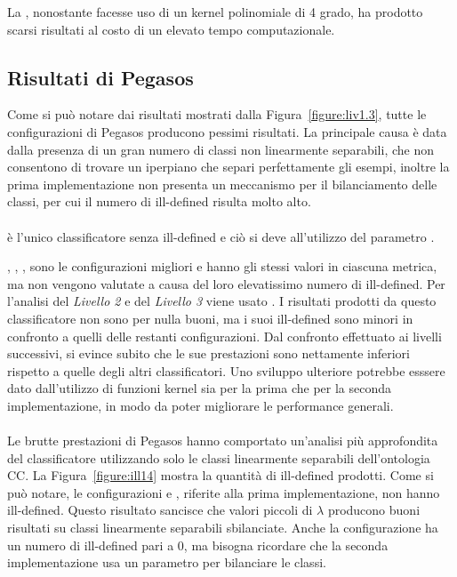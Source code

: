 \documentclass[12pt,a4paper,oneside,hidelinks]{report}
\begin{document}
La , nonostante facesse uso di un kernel polinomiale di 4 grado, ha prodotto scarsi risultati al costo di un elevato tempo computazionale.

\subsection{Risultati di Pegasos}
Come si può notare dai risultati mostrati dalla Figura~\ref{figure:liv1.3}, tutte le configurazioni di Pegasos producono pessimi risultati. La principale causa è data dalla presenza di un gran numero di classi non linearmente separabili, che non consentono di trovare un iperpiano che separi perfettamente gli esempi, inoltre la prima implementazione non presenta un meccanismo per il bilanciamento delle classi, per cui il numero di ill-defined risulta molto alto.

\paragraph*{}
 è l'unico classificatore senza ill-defined e ciò si deve all'utilizzo del parametro .

, , ,  sono le configurazioni migliori e hanno gli stessi valori in ciascuna metrica, ma non vengono valutate a causa del loro elevatissimo numero di ill-defined. Per l'analisi del \textit{Livello 2} e del \textit{Livello 3} viene usato . I risultati prodotti da questo classificatore non sono per nulla buoni, ma i suoi ill-defined sono minori in confronto a quelli delle restanti configurazioni. Dal confronto effettuato ai livelli successivi, si evince subito che le sue prestazioni sono nettamente inferiori rispetto a quelle degli altri classificatori.
Uno sviluppo ulteriore potrebbe esssere dato dall'utilizzo di funzioni kernel sia per la prima che per la seconda implementazione, in modo da poter migliorare le performance generali.

\paragraph*{}
Le brutte prestazioni di Pegasos hanno comportato un'analisi più approfondita del classificatore utilizzando solo le classi linearmente separabili dell'ontologia CC.
La Figura~\ref{figure:ill14} mostra la quantità di ill-defined prodotti. Come si può notare, le configurazioni  e , riferite alla prima implementazione, non hanno ill-defined. Questo risultato sancisce che valori piccoli di $\lambda$ producono buoni risultati su classi linearmente separabili sbilanciate. Anche la configurazione  ha un numero di ill-defined pari a 0, ma bisogna ricordare che la seconda implementazione usa un parametro per bilanciare le classi.
\end{document}
